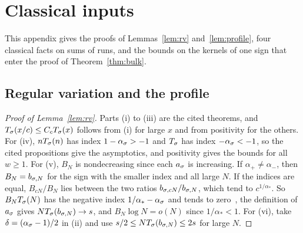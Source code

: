 \section{Classical inputs}\label{app:classical}

This appendix gives the proofs of Lemmas~\ref{lem:rv} and~\ref{lem:profile}, four
classical facts on sums of runs, and the bounds on the kernels of one sign that
enter the proof of Theorem~\ref{thm:bulk}.

\subsection{Regular variation and the profile}\label{app:rv}

\begin{proof}[Proof of Lemma~\ref{lem:rv}]
Parts (i) to (iii) are the cited theorems, and $T_\sigma(x/c)\le C_cT_\sigma(x)$ follows
from (i) for large $x$ and from positivity for the others. For (iv), $nT_\sigma(n)$ has
index $1-\alpha_\sigma>-1$ and $T_\sigma$ has index $-\alpha_\sigma<-1$, so the cited
propositions give the asymptotics, and positivity gives the bounds for all $w\ge1$.
For (v), $B_N$ is nondecreasing since each $a_\sigma$ is increasing. If
$\alpha_\plus\ne\alpha_\minus$, then $B_N=b_{\sigma,N}$ for the sign with the smaller index
and all large $N$. If the indices are equal, $B_{cN}/B_N$ lies between the two ratios
$b_{\sigma,cN}/b_{\sigma,N}$, which tend to $c^{1/\alpha_*}$. So $B_NT_\sigma(N)$ has the
negative index $1/\alpha_*-\alpha_\sigma$ and tends to
zero~\cite[Proposition~1.5.1]{bgt1989}, the definition of $a_\sigma$ gives
$NT_\sigma(b_{\sigma,N})\to s$, and $B_N\log N=o(N)$ since $1/\alpha_*<1$. For (vi), take
$\delta=(\alpha_\sigma-1)/2$ in (ii) and use $s/2\le NT_\sigma(b_{\sigma,N})\le2s$ for large $N$.
\end{proof}

